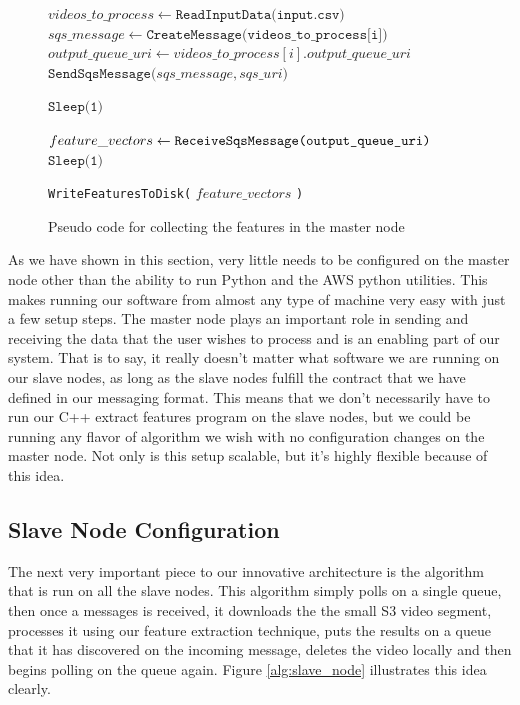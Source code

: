 \begin{figure}[h]
\begin{algorithmic}[1]
  \State $videos\_to\_process \gets \texttt{ReadInputData(input.csv)}$
    \State $sqs\_message \gets \texttt{CreateMessage(videos\_to\_process[i])}$
    \State $output\_queue\_uri \gets videos\_to\_process[i].output\_queue\_uri$
    \State$\texttt{SendSqsMessage(}sqs\_message, sqs\_uri \texttt{)}$
  \EndFor

   
    \State $\texttt{Sleep(1)}$
  \EndWhile

    \State $feature\_vectors \gets \texttt{ReceiveSqsMessage(output\_queue\_uri\texttt{)}}$
    \State $\texttt{Sleep(1)}$
  \EndWhile

  \State \texttt{WriteFeaturesToDisk(} $feature\_vectors$ \texttt{)}

\end{algorithmic}
\caption{Pseudo code for collecting the features in the master node}
\label{alg:master_node}
\end{figure}

As we have shown in this section, very little needs to be configured on the master
node other than the ability to run Python and the AWS python utilities. This
makes running our software from almost any type of machine very easy with just a
few setup steps. The master node plays an important role in sending and receiving
the data that the user wishes to process and is an enabling part of our system.
That is to say, it really doesn't matter what software we are running on our
slave nodes, as long as the slave nodes fulfill the contract that we have
defined in our messaging format. This means that we don't necessarily have to
run our C++ extract features program on the slave nodes, but we could be running
any flavor of algorithm we wish with no configuration changes on the master node.
Not only is this setup scalable, but it's highly flexible because of this idea.

\subsection{\label{subsection:slave_node}Slave Node Configuration }
The next very important piece to our innovative architecture is the algorithm
that is run on all the slave nodes. This algorithm simply polls on a single
queue, then once a messages is received, it downloads the the small S3 video
segment, processes it using our feature extraction technique, puts the results
on a queue that it has discovered on the incoming message, deletes the video
locally and then begins polling on the queue again. Figure \ref{alg:slave_node}
illustrates this idea clearly.


